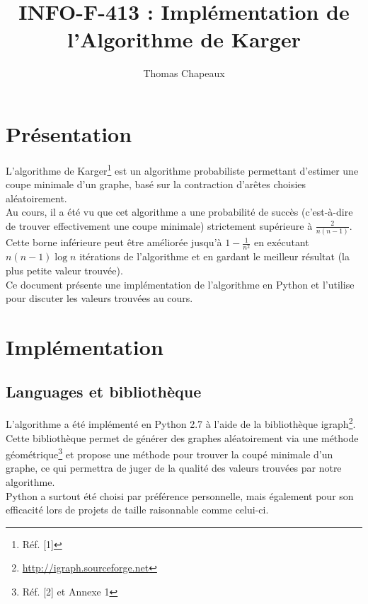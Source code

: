 \documentclass[a4paper,10pt]{article}
\title{INFO-F-413 : Implémentation de l'Algorithme de Karger}
\author{Thomas Chapeaux}
\begin{document}
\sloppy
\maketitle

\section{Présentation}

L'algorithme de 
Karger\footnote{Réf. [1]}
est un algorithme probabiliste permettant d'estimer une coupe minimale d'un graphe,
basé sur la contraction d'arêtes choisies aléatoirement.\\

Au cours, il a été vu que cet algorithme a une probabilité de succès (c'est-à-dire de trouver effectivement une coupe minimale) strictement supérieure à
\begin{math} \frac{2}{n(n-1)} \end{math}.
Cette borne inférieure peut être améliorée jusqu'à
\begin{math} 1- \frac{1}{n^{2}} \end{math} en exécutant
\begin{math} n(n-1)\log{n} \end{math} itérations de l'algorithme et en gardant le meilleur résultat (la plus petite valeur trouvée).\\

Ce document présente une implémentation de l'algorithme en Python et l'utilise pour discuter les valeurs trouvées au cours.\\

\section{Implémentation}

\subsection{Languages et bibliothèque}
L'algorithme a été implémenté en Python 2.7 à l'aide de la bibliothèque
igraph\footnote{\url{http://igraph.sourceforge.net}}.
Cette bibliothèque permet de générer des graphes aléatoirement via une méthode
géométrique\footnote{Réf. [2] et Annexe 1}
et propose une méthode pour trouver la coupé minimale d'un graphe, ce qui permettra de juger de la qualité des valeurs trouvées par notre algorithme.\\

Python a surtout été choisi par préférence personnelle, mais également pour son efficacité lors de projets de taille raisonnable comme celui-ci.\\
\end{document}
